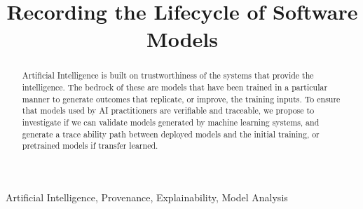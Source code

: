 \documentclass[conference]{IEEEtran}
\begin{document}

\title{
Recording the Lifecycle of Software Models
}

\author{

}

\maketitle

\begin{abstract}
Artificial Intelligence is built on trustworthiness of the systems that provide the intelligence.
The bedrock of these are models that have been trained in a particular manner to generate outcomes that replicate, or improve, the training inputs. To ensure that models used by AI practitioners are verifiable and traceable, we propose to investigate if we can validate models generated by machine learning systems, and generate a trace ability path between deployed models and the initial training, or pretrained models if transfer learned.
\end{abstract}

\begin{IEEEkeywords}
Artificial Intelligence, Provenance, Explainability, Model Analysis\end{IEEEkeywords}







  
 
\end{document}

